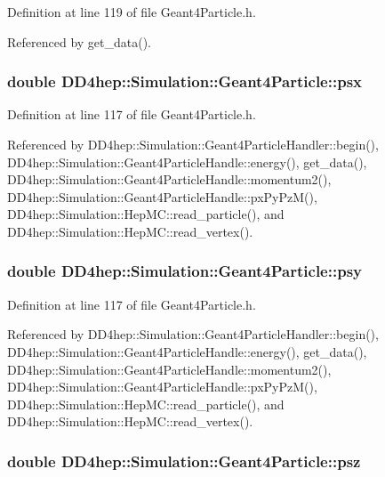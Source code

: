 Definition at line 119 of file Geant4Particle.h.

Referenced by get\_\-data().\hypertarget{class_d_d4hep_1_1_simulation_1_1_geant4_particle_a2c169e0bf0dc706a43254c4c8ca9ccc2}{
\subsubsection[{psx}]{\setlength{\rightskip}{0pt plus 5cm}double {\bf DD4hep::Simulation::Geant4Particle::psx}}}
\label{class_d_d4hep_1_1_simulation_1_1_geant4_particle_a2c169e0bf0dc706a43254c4c8ca9ccc2}


Definition at line 117 of file Geant4Particle.h.

Referenced by DD4hep::Simulation::Geant4ParticleHandler::begin(), DD4hep::Simulation::Geant4ParticleHandle::energy(), get\_\-data(), DD4hep::Simulation::Geant4ParticleHandle::momentum2(), DD4hep::Simulation::Geant4ParticleHandle::pxPyPzM(), DD4hep::Simulation::HepMC::read\_\-particle(), and DD4hep::Simulation::HepMC::read\_\-vertex().\hypertarget{class_d_d4hep_1_1_simulation_1_1_geant4_particle_abc3b6008b4d4366bce059fa360e8d3c7}{
\subsubsection[{psy}]{\setlength{\rightskip}{0pt plus 5cm}double {\bf DD4hep::Simulation::Geant4Particle::psy}}}
\label{class_d_d4hep_1_1_simulation_1_1_geant4_particle_abc3b6008b4d4366bce059fa360e8d3c7}


Definition at line 117 of file Geant4Particle.h.

Referenced by DD4hep::Simulation::Geant4ParticleHandler::begin(), DD4hep::Simulation::Geant4ParticleHandle::energy(), get\_\-data(), DD4hep::Simulation::Geant4ParticleHandle::momentum2(), DD4hep::Simulation::Geant4ParticleHandle::pxPyPzM(), DD4hep::Simulation::HepMC::read\_\-particle(), and DD4hep::Simulation::HepMC::read\_\-vertex().\hypertarget{class_d_d4hep_1_1_simulation_1_1_geant4_particle_a1caec949ea63cfe52c101007c0ebcaea}{
\subsubsection[{psz}]{\setlength{\rightskip}{0pt plus 5cm}double {\bf DD4hep::Simulation::Geant4Particle::psz}}}
\label{class_d_d4hep_1_1_simulation_1_1_geant4_particle_a1caec949ea63cfe52c101007c0ebcaea}



